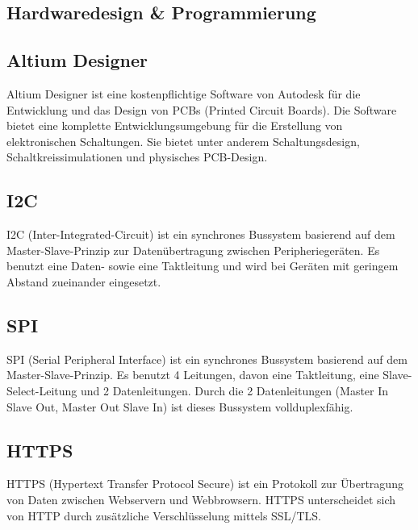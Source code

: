 \begin{inhalt}
\renewcommand*\chapterpagestyle{scrheadings}
 \section{Hardwaredesign \& Programmierung}
 
\subsection{Altium Designer}

Altium Designer ist eine kostenpflichtige Software von Autodesk für die Entwicklung und das Design von PCBs (Printed Circuit Boards). Die Software bietet eine komplette Entwicklungsumgebung für die Erstellung von elektronischen Schaltungen. Sie bietet unter anderem Schaltungsdesign, Schaltkreissimulationen und physisches PCB-Design. 
 \cite{AltiumDesignerWiki}

\subsection{I2C}

I2C (Inter-Integrated-Circuit) ist ein synchrones Bussystem basierend auf dem Master-Slave-Prinzip zur Datenübertragung zwischen Peripheriegeräten. Es benutzt eine Daten- sowie eine Taktleitung und wird bei Geräten mit geringem Abstand zueinander eingesetzt. 
 \cite{I2C_Kommunikation}

\subsection{SPI}

SPI (Serial Peripheral Interface) ist ein synchrones Bussystem basierend auf dem Master-Slave-Prinzip. Es benutzt 4 Leitungen, davon eine Taktleitung, eine Slave-Select-Leitung und 2 Datenleitungen. Durch die 2 Datenleitungen (Master In Slave Out, Master Out Slave In) ist dieses Bussystem vollduplexfähig. \cite{SPI_Kommunikation}

\subsection{HTTPS}

HTTPS (Hypertext Transfer Protocol Secure) ist ein Protokoll zur Übertragung von Daten zwischen Webservern und Webbrowsern. HTTPS unterscheidet sich von HTTP durch zusätzliche Verschlüsselung mittels SSL/TLS. \cite{HTTPS_Kommunkation}


\end{inhalt}
